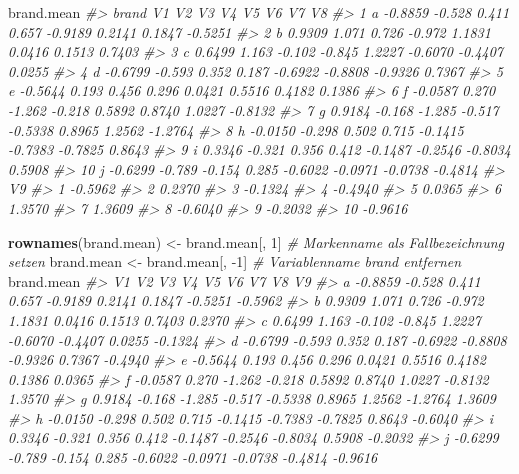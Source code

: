 \documentclass[12pt,]{book}
\newenvironment{Shaded}{\begin{snugshade}}{\end{snugshade}}
\newcommand{\KeywordTok}[1]{\textcolor[rgb]{0.13,0.29,0.53}{\textbf{{#1}}}}
\newcommand{\DecValTok}[1]{\textcolor[rgb]{0.00,0.00,0.81}{{#1}}}
\newcommand{\StringTok}[1]{\textcolor[rgb]{0.31,0.60,0.02}{{#1}}}
\newcommand{\CommentTok}[1]{\textcolor[rgb]{0.56,0.35,0.01}{\textit{{#1}}}}
\newcommand{\NormalTok}[1]{{#1}}
\begin{document}
\begin{Shaded}
\begin{Highlighting}[]
\NormalTok{brand.mean}
\CommentTok{#>    brand      V1     V2     V3     V4      V5      V6      V7      V8}
\CommentTok{#> 1      a -0.8859 -0.528  0.411  0.657 -0.9189  0.2141  0.1847 -0.5251}
\CommentTok{#> 2      b  0.9309  1.071  0.726 -0.972  1.1831  0.0416  0.1513  0.7403}
\CommentTok{#> 3      c  0.6499  1.163 -0.102 -0.845  1.2227 -0.6070 -0.4407  0.0255}
\CommentTok{#> 4      d -0.6799 -0.593  0.352  0.187 -0.6922 -0.8808 -0.9326  0.7367}
\CommentTok{#> 5      e -0.5644  0.193  0.456  0.296  0.0421  0.5516  0.4182  0.1386}
\CommentTok{#> 6      f -0.0587  0.270 -1.262 -0.218  0.5892  0.8740  1.0227 -0.8132}
\CommentTok{#> 7      g  0.9184 -0.168 -1.285 -0.517 -0.5338  0.8965  1.2562 -1.2764}
\CommentTok{#> 8      h -0.0150 -0.298  0.502  0.715 -0.1415 -0.7383 -0.7825  0.8643}
\CommentTok{#> 9      i  0.3346 -0.321  0.356  0.412 -0.1487 -0.2546 -0.8034  0.5908}
\CommentTok{#> 10     j -0.6299 -0.789 -0.154  0.285 -0.6022 -0.0971 -0.0738 -0.4814}
\CommentTok{#>         V9}
\CommentTok{#> 1  -0.5962}
\CommentTok{#> 2   0.2370}
\CommentTok{#> 3  -0.1324}
\CommentTok{#> 4  -0.4940}
\CommentTok{#> 5   0.0365}
\CommentTok{#> 6   1.3570}
\CommentTok{#> 7   1.3609}
\CommentTok{#> 8  -0.6040}
\CommentTok{#> 9  -0.2032}
\CommentTok{#> 10 -0.9616}

\KeywordTok{rownames}\NormalTok{(brand.mean) <-}\StringTok{ }\NormalTok{brand.mean[, }\DecValTok{1}\NormalTok{] }\CommentTok{# Markenname als Fallbezeichnung setzen}
\NormalTok{brand.mean <-}\StringTok{ }\NormalTok{brand.mean[, -}\DecValTok{1}\NormalTok{]          }\CommentTok{# Variablenname brand entfernen}
\NormalTok{brand.mean}
\CommentTok{#>        V1     V2     V3     V4      V5      V6      V7      V8      V9}
\CommentTok{#> a -0.8859 -0.528  0.411  0.657 -0.9189  0.2141  0.1847 -0.5251 -0.5962}
\CommentTok{#> b  0.9309  1.071  0.726 -0.972  1.1831  0.0416  0.1513  0.7403  0.2370}
\CommentTok{#> c  0.6499  1.163 -0.102 -0.845  1.2227 -0.6070 -0.4407  0.0255 -0.1324}
\CommentTok{#> d -0.6799 -0.593  0.352  0.187 -0.6922 -0.8808 -0.9326  0.7367 -0.4940}
\CommentTok{#> e -0.5644  0.193  0.456  0.296  0.0421  0.5516  0.4182  0.1386  0.0365}
\CommentTok{#> f -0.0587  0.270 -1.262 -0.218  0.5892  0.8740  1.0227 -0.8132  1.3570}
\CommentTok{#> g  0.9184 -0.168 -1.285 -0.517 -0.5338  0.8965  1.2562 -1.2764  1.3609}
\CommentTok{#> h -0.0150 -0.298  0.502  0.715 -0.1415 -0.7383 -0.7825  0.8643 -0.6040}
\CommentTok{#> i  0.3346 -0.321  0.356  0.412 -0.1487 -0.2546 -0.8034  0.5908 -0.2032}
\CommentTok{#> j -0.6299 -0.789 -0.154  0.285 -0.6022 -0.0971 -0.0738 -0.4814 -0.9616}
\end{Highlighting}
\end{Shaded}
\end{document}
